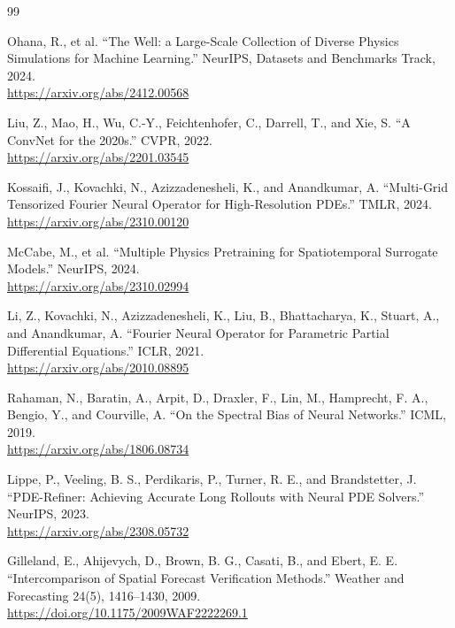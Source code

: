 \documentclass[11pt]{article}
\begin{document}
\begin{thebibliography}{99}
\setlength{\itemsep}{8pt}

Ohana, R., et al.
``The Well: a Large-Scale Collection of Diverse Physics Simulations for Machine Learning.''
NeurIPS, Datasets and Benchmarks Track, 2024.\\
\url{https://arxiv.org/abs/2412.00568}

Liu, Z., Mao, H., Wu, C.-Y., Feichtenhofer, C., Darrell, T., and Xie, S.
``A ConvNet for the 2020s.''
CVPR, 2022.\\
\url{https://arxiv.org/abs/2201.03545}

Kossaifi, J., Kovachki, N., Azizzadenesheli, K., and Anandkumar, A.
``Multi-Grid Tensorized Fourier Neural Operator for High-Resolution PDEs.''
TMLR, 2024.\\
\url{https://arxiv.org/abs/2310.00120}

McCabe, M., et al.
``Multiple Physics Pretraining for Spatiotemporal Surrogate Models.''
NeurIPS, 2024.\\
\url{https://arxiv.org/abs/2310.02994}

Li, Z., Kovachki, N., Azizzadenesheli, K., Liu, B., Bhattacharya, K., Stuart, A., and Anandkumar, A.
``Fourier Neural Operator for Parametric Partial Differential Equations.''
ICLR, 2021.\\
\url{https://arxiv.org/abs/2010.08895}

Rahaman, N., Baratin, A., Arpit, D., Draxler, F., Lin, M., Hamprecht, F. A., Bengio, Y., and Courville, A.
``On the Spectral Bias of Neural Networks.''
ICML, 2019.\\
\url{https://arxiv.org/abs/1806.08734}

Lippe, P., Veeling, B. S., Perdikaris, P., Turner, R. E., and Brandstetter, J.
``PDE-Refiner: Achieving Accurate Long Rollouts with Neural PDE Solvers.''
NeurIPS, 2023.\\
\url{https://arxiv.org/abs/2308.05732}

Gilleland, E., Ahijevych, D., Brown, B. G., Casati, B., and Ebert, E. E.
``Intercomparison of Spatial Forecast Verification Methods.''
Weather and Forecasting 24(5), 1416--1430, 2009.\\
\url{https://doi.org/10.1175/2009WAF2222269.1}


\end{thebibliography}
\end{document}
